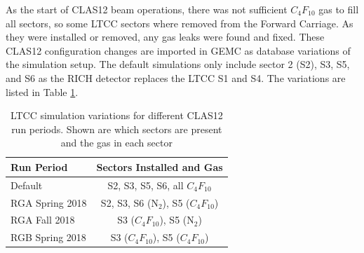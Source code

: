 As the start of CLAS12 beam operations, there was not sufficient $C_4F_{10}$ gas to fill all sectors, so some LTCC sectors
where removed from the Forward Carriage. As they were installed or removed, any gas leaks were found and fixed.
These CLAS12 configuration changes are imported in GEMC as database variations of the simulation setup.
The default simulations only include sector 2 (S2), S3, S5, and S6 as the RICH detector replaces the LTCC S1 and S4.
The variations are listed in Table \ref{tab:simVariations}.

\begin{table}
	\begin{center}
		\begin{tabular}{| l | c |}
			\hline \hline
			Run Period       & Sectors Installed and Gas \\
			\hline
			Default          & S2, S3, S5, S6, all $C_4F_{10}$    \\
			RGA Spring 2018  & S2, S3, S6 (N$_2$), S5 ($C_4F_{10}$)  \\
			RGA Fall 2018    & S3 ($C_4F_{10}$), S5 (N$_2$)          \\
			RGB Spring 2018  & S3 ($C_4F_{10}$), S5 ($C_4F_{10}$) \\
			\hline \hline
		\end{tabular}
	\end{center}
	\caption{LTCC simulation variations for different CLAS12 run periods. Shown are which sectors are present and the gas in each sector}
	\label{tab:simVariations}
\end{table}






